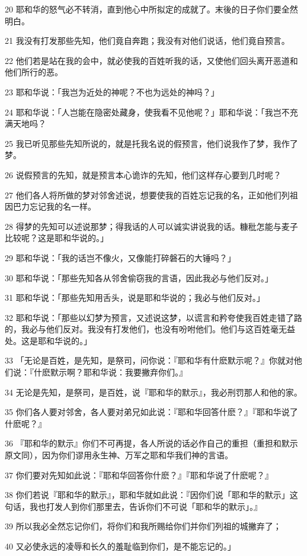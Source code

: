 \par 20 耶和华的怒气必不转消，直到他心中所拟定的成就了。末後的日子你们要全然明白。
\par 21 我没有打发那些先知，他们竟自奔跑；我没有对他们说话，他们竟自预言。
\par 22 他们若是站在我的会中，就必使我的百姓听我的话，又使他们回头离开恶道和他们所行的恶。
\par 23 耶和华说：「我岂为近处的神呢？不也为远处的神吗？」
\par 24 耶和华说：「人岂能在隐密处藏身，使我看不见他呢？」耶和华说：「我岂不充满天地吗？
\par 25 我已听见那些先知所说的，就是托我名说的假预言，他们说我作了梦，我作了梦。
\par 26 说假预言的先知，就是预言本心诡诈的先知，他们这样存心要到几时呢？
\par 27 他们各人将所做的梦对邻舍述说，想要使我的百姓忘记我的名，正如他们列祖因巴力忘记我的名一样。
\par 28 得梦的先知可以述说那梦；得我话的人可以诚实讲说我的话。糠秕怎能与麦子比较呢？这是耶和华说的。」
\par 29 耶和华说：「我的话岂不像火，又像能打碎磐石的大锤吗？」
\par 30 耶和华说：「那些先知各从邻舍偷窃我的言语，因此我必与他们反对。」
\par 31 耶和华说：「那些先知用舌头，说是耶和华说的；我必与他们反对。」
\par 32 耶和华说：「那些以幻梦为预言，又述说这梦，以谎言和矜夸使我百姓走错了路的，我必与他们反对。我没有打发他们，也没有吩咐他们。他们与这百姓毫无益处。这是耶和华说的。」
\par 33 「无论是百姓，是先知，是祭司，问你说：『耶和华有什麽默示呢？』你就对他们说：『什麽默示啊？耶和华说：我要撇弃你们。』
\par 34 无论是先知，是祭司，是百姓，说『耶和华的默示』，我必刑罚那人和他的家。
\par 35 你们各人要对邻舍，各人要对弟兄如此说：『耶和华回答什麽？』『耶和华说了什麽呢？』
\par 36 『耶和华的默示』你们不可再提，各人所说的话必作自己的重担（重担和默示原文同），因为你们谬用永生神、万军之耶和华我们神的言语。
\par 37 你们要对先知如此说：『耶和华回答你什麽？』『耶和华说了什麽呢？』
\par 38 你们若说『耶和华的默示』，耶和华就如此说：『因你们说「耶和华的默示」这句话，我也打发人到你们那里去，告诉你们不可说「耶和华的默示」。』
\par 39 所以我必全然忘记你们，将你们和我所赐给你们并你们列祖的城撇弃了；
\par 40 又必使永远的凌辱和长久的羞耻临到你们，是不能忘记的。」

